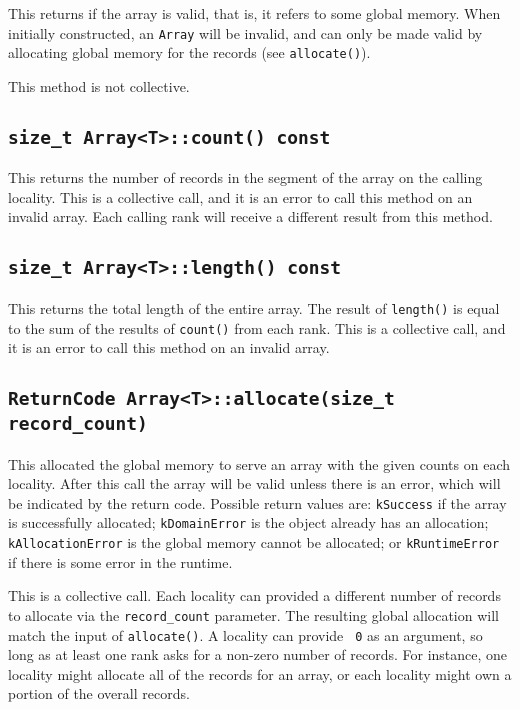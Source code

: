 \documentclass[11pt]{book}
\begin{document}
This returns if the array is valid, that is, it refers to some global memory.
When initially constructed, an {\tt Array} will be invalid, and can only be made
valid by allocating global memory for the records (see {\tt allocate()}).

This method is not collective.

\subsection{{\tt size\_t Array<T>::count() const}}

This returns the number of records in the segment of the array on the calling
locality. This is a collective call, and it is an error to call this method
on an invalid array. Each calling rank will receive a different result from
this method.

\subsection{{\tt size\_t Array<T>::length() const}}

This returns the total length of the entire array. The result of {\tt length()}
is equal to the sum of the results of {\tt count()} from each rank. This is a
collective call, and it is an error to call this method on an invalid array.

\subsection{{\tt ReturnCode Array<T>::allocate(size\_t record\_count)}}

This allocated the global memory to serve an array with the given counts on
each locality. After this call the array will be valid unless there is an
error, which will be indicated by the return code. Possible return values are:
{\tt kSuccess} if the array is successfully allocated; {\tt kDomainError} is the
object already has an allocation; {\tt kAllocationError} is the global memory
cannot be allocated; or {\tt kRuntimeError} if there is some error in the
runtime. 

This is a collective call. Each locality can provided a different number of
records to allocate via the {\tt record\_count} parameter. The resulting global
allocation will match the input of {\tt allocate()}. A locality can provide {\tt
  0} as an argument, so long as at least one rank asks for a non-zero number of
records. For instance, one locality might allocate all of the records for
an array, or each locality might own a portion of the overall records.
\end{document}
